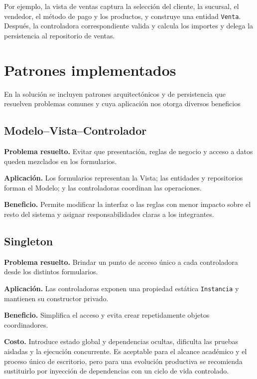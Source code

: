 \documentclass[12pt,a4paper]{article}
\begin{document}
Por ejemplo, la vista de ventas captura la selección del cliente, la sucursal,
el vendedor, el método de pago y los productos, y construye una entidad
\texttt{Venta}. Después, la controladora correspondiente valida y calcula los
importes y delega la persistencia al repositorio de ventas.

\section{Patrones implementados}

En la solución se incluyen patrones arquitectónicos y de persistencia que resuelven problemas comunes y cuya aplicación nos otorga diversos beneficios

\subsection{Modelo--Vista--Controlador}

\textbf{Problema resuelto.} Evitar que presentación, reglas de negocio y
acceso a datos queden mezclados en los formularios.

\textbf{Aplicación.} Los formularios representan la Vista; las entidades y
repositorios forman el Modelo; y las controladoras coordinan las operaciones.

\textbf{Beneficio.} Permite modificar la interfaz o las reglas con menor
impacto sobre el resto del sistema y asignar responsabilidades claras a los
integrantes.

\subsection{Singleton}

\textbf{Problema resuelto.} Brindar un punto de acceso único a cada
controladora desde los distintos formularios.

\textbf{Aplicación.} Las controladoras exponen una propiedad estática
\texttt{Instancia} y mantienen su constructor privado.

\textbf{Beneficio.} Simplifica el acceso y evita crear repetidamente objetos
coordinadores.

\textbf{Costo.} Introduce estado global y dependencias ocultas, dificulta las
pruebas aisladas y la ejecución concurrente. Es aceptable para el alcance
académico y el proceso único de escritorio, pero para una evolución productiva
se recomienda sustituirlo por inyección de dependencias con un ciclo de vida
controlado.
\end{document}
